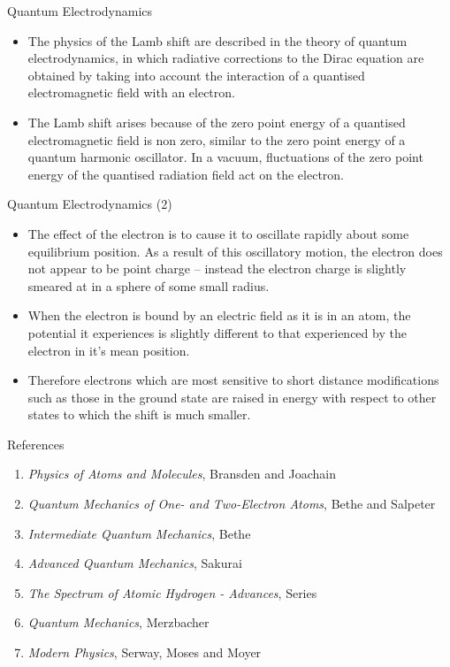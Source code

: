 \documentclass[xcolor=dvipsnames,t]{beamer}
\begin{document}
    \begin{frame}{Quantum Electrodynamics}
        \begin{itemize} 
        \item The physics of the Lamb shift are described in the theory of quantum electrodynamics,
    in which radiative corrections to the Dirac equation are obtained by taking into
    account the interaction of a quantised electromagnetic field with an electron.

    \item The Lamb shift arises because of the zero point energy of a quantised electromagnetic
    field is non zero, similar to the zero point energy of a quantum harmonic oscillator.
    In a vacuum, fluctuations of the zero point energy of the quantised radiation field
    act on the electron. 
    \end{itemize} 
\end{frame} 

    \begin{frame}{Quantum Electrodynamics (2)} 
    \begin{itemize}     
    \item The effect of the electron is to cause it to oscillate rapidly
    about some equilibrium position. As a result of this oscillatory motion, the electron
    does not appear to be point charge -- instead the electron charge is slightly smeared
    at in a sphere of some small radius. 
    
    \item When the electron is bound by an electric field
    as it is in an atom, the potential it experiences is slightly different to that 
    experienced by the electron in it's mean position. 
    
    \item Therefore electrons which are
    most sensitive to short distance modifications such as those in the ground state
    are raised in energy with respect to other states to which the shift is much smaller.
        \end{itemize} 
    \end{frame} 

    \begin{frame}{References} 
    \begin{enumerate}
        \item \emph{Physics of Atoms and Molecules}, Bransden and Joachain
        \item \emph{Quantum Mechanics of One- and Two-Electron Atoms},
                    Bethe and Salpeter
        \item \emph{Intermediate Quantum Mechanics}, Bethe
        \item \emph{Advanced Quantum Mechanics}, Sakurai
        \item \emph{The Spectrum of Atomic Hydrogen - Advances}, Series
        \item \emph{Quantum Mechanics}, Merzbacher
        \item \emph{Modern Physics}, Serway, Moses and Moyer
    \end{enumerate}
    \end{frame} 
\end{document}
